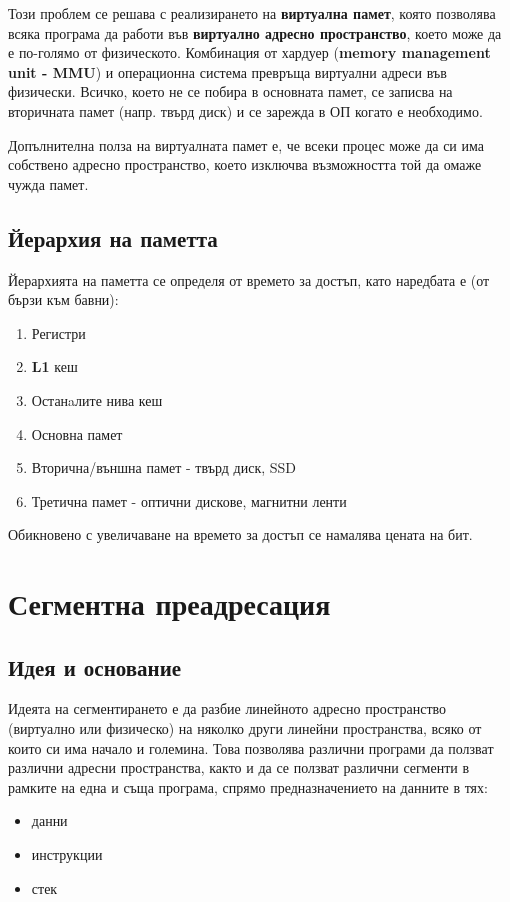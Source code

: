 \documentclass[fleqn,12pt]{article}
\begin{document}
Този проблем се решава с реализирането на \textbf{виртуална памет}, която позволява всяка програма да работи във \textbf{виртуално адресно пространство},
което може да е по-голямо от физическото. Комбинация от хардуер (\textbf{memory management unit - MMU}) и операционна система превръща 
виртуални адреси във физически. Всичко, което не се побира в основната памет, се записва на вторичната памет (напр. твърд диск) и се 
зарежда в ОП когато е необходимо.

Допълнителна полза на виртуалната памет е, че всеки процес може да си има собствено адресно пространство, което изключва възможността
той да омаже чужда памет.

\subsection{Йерархия на паметта}
Йерархията на паметта се определя от времето за достъп, като наредбата е (от бързи към бавни):
\begin{enumerate}
    \item Регистри
    \item \textbf{L1} кеш
    \item Останaлите нива кеш
    \item Основна памет
    \item Вторична/външна памет - твърд диск, SSD
    \item Третична памет - оптични дискове, магнитни ленти
\end{enumerate}

Обикновено с увеличаване на времето за достъп се намалява цената на бит.

\section{Сегментна преадресация}

\subsection{Идея и основание}
Идеята на сегментирането е да разбие линейното адресно пространство (виртуално или физическо) на няколко други линейни пространства,
всяко от които си има начало и големина.
Това позволява различни програми да ползват различни адресни пространства, както и да се ползват различни сегменти в рамките на една и съща 
програма, спрямо предназначението на данните в тях:
\begin{itemize}
    \item данни
    \item инструкции
    \item стек
\end{itemize}
\end{document}
